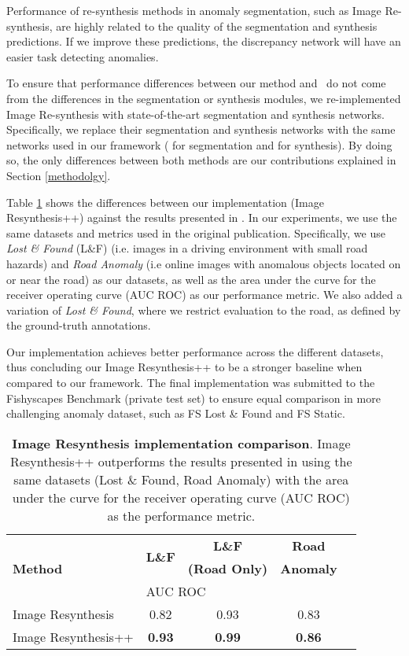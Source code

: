 \documentclass[final]{cvpr}
\begin{document}
Performance of re-synthesis methods in anomaly segmentation, such as Image Re-synthesis, are highly related to the quality of the segmentation and synthesis predictions. If we improve these  predictions, the discrepancy network will have an easier task detecting anomalies.

To ensure that performance differences between our method and~\cite{epfl} do not come from the differences in the segmentation or synthesis modules, we re-implemented Image Re-synthesis with state-of-the-art segmentation and synthesis networks. Specifically, we replace their segmentation and synthesis networks with the same networks used in our framework (\cite{DeepLabV3+Label} for segmentation and \cite{ccfpse} for synthesis). By doing so, the only differences between both methods are our contributions explained in Section \ref{methodolgy}. 

Table \ref{tab:baseline_comparison} shows the differences between our implementation (Image Resynthesis++) against the results presented in \cite{epfl}. In our experiments, we use the same datasets and metrics used in the original publication. Specifically, we use \textit{Lost \& Found} (L\&F) \cite{LostFound} (i.e. images in a driving environment with small road hazards) and \textit{Road Anomaly} \cite{epfl} (i.e online images with anomalous objects located on or near the road) as our datasets, as well as the area under the curve for the receiver operating curve (AUC ROC) as our performance metric. 
We also added a variation of \textit{Lost \& Found}, where we restrict evaluation to the road, as defined by the ground-truth annotations. 

Our implementation achieves better performance across the different datasets, thus concluding our Image Resynthesis++ to be a stronger baseline when compared to our framework. The final implementation was submitted to the Fishyscapes Benchmark (private test set) to ensure equal comparison in more challenging anomaly dataset, such as FS Lost \& Found and FS Static.  

\begin{table}[!htp]\centering
\setlength{\tabcolsep}{3.5pt}
\begin{tabular}{lcccc}\toprule
\multirow{3}{*}{\textbf{Method}} &\multirow{2}{*}{\textbf{L\&F}} &{\textbf{L\&F}} &\textbf{Road} \\
& &\textbf{(Road Only)} &\textbf{Anomaly}\\ 
&\multicolumn{3}{l}{\qquad \hspace{3pt}  AUC ROC} \\ \midrule
Image Resynthesis &0.82 &0.93 &0.83 \\
Image Resynthesis++ &\textbf{0.93} &\textbf{0.99} &\textbf{0.86} \\
\bottomrule
\end{tabular}
\caption{\textbf{Image Resynthesis implementation comparison}. Image Resynthesis++ outperforms the results presented in \cite{epfl} using the same datasets (Lost \& Found, Road Anomaly) with the area under the curve for the receiver operating curve (AUC ROC) as the performance metric.}
\label{tab:baseline_comparison}
\end{table}
\end{document}
